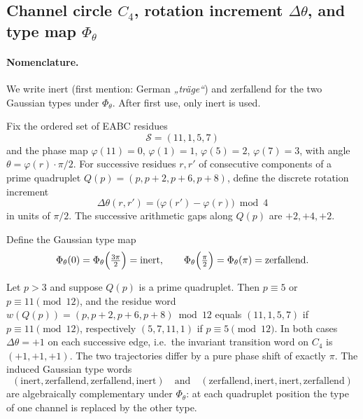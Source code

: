 
\subsection{Channel circle \(C_4\), rotation increment \(\Delta\theta\), and type map \(\Phi_\theta\)}

\paragraph{Nomenclature.}
We write \(\mathrm{inert}\) (first mention: German \emph{„träge“}) and
\(\mathrm{zerfallend}\) for the two Gaussian types under \(\Phi_\theta\).
After first use, only \(\mathrm{inert}\) is used.

Fix the ordered set of EABC residues
\[
\mathcal{S}=(11,1,5,7)
\]
and the phase map \(\varphi(11)=0\), \(\varphi(1)=1\), \(\varphi(5)=2\), \(\varphi(7)=3\),
with angle \(\theta=\varphi(r)\cdot\pi/2\).
For successive residues \(r,r'\) of consecutive components of a prime quadruplet
\(Q(p)=(p,p+2,p+6,p+8)\), define the discrete rotation increment
\[
\Delta\theta(r,r')=\bigl(\varphi(r')-\varphi(r)\bigr)\bmod 4
\]
in units of \(\pi/2\). The successive arithmetic gaps along \(Q(p)\) are
\(+2,+4,+2\).

Define the Gaussian type map
\[
\Phi_\theta(0)=\Phi_\theta\Bigl(\tfrac{3\pi}{2}\Bigr)=\mathrm{inert},\qquad
\Phi_\theta\Bigl(\tfrac{\pi}{2}\Bigr)=\Phi_\theta(\pi)=\mathrm{zerfallend}.
\]

\begin{proposition}
\label{prop:quad-c4}
Let \(p>3\) and suppose \(Q(p)\) is a prime quadruplet. Then
\(p\equiv 5\) or \(p\equiv 11\pmod{12}\), and the residue word
\(w(Q(p))=(p,p+2,p+6,p+8)\bmod 12\) equals
\((11,1,5,7)\) if \(p\equiv 11\pmod{12}\), respectively
\((5,7,11,1)\) if \(p\equiv 5\pmod{12}\).
In both cases \(\Delta\theta=+1\) on each successive edge, i.e.\ the invariant
transition word on \(C_4\) is \((+1,+1,+1)\).
The two trajectories differ by a pure phase shift of exactly \(\pi\).
The induced Gaussian type words
\[
(\mathrm{inert},\mathrm{zerfallend},\mathrm{zerfallend},\mathrm{inert})
\quad\text{and}\quad
(\mathrm{zerfallend},\mathrm{inert},\mathrm{inert},\mathrm{zerfallend})
\]
are algebraically complementary under \(\Phi_\theta\):
at each quadruplet position the type of one channel is replaced by the other type.
\end{proposition}

